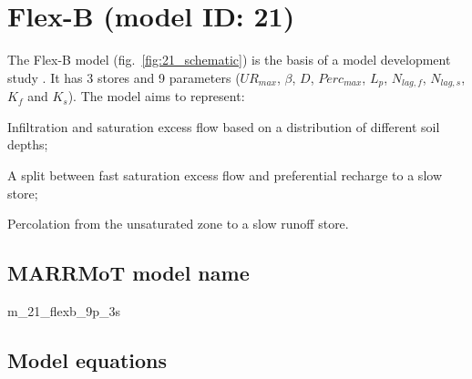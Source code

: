 \section{Flex-B (model ID: 21)}
The Flex-B model (fig.~\ref{fig:21_schematic}) is the basis of a model development study \citep{Fenicia2008}. It has 3 stores and 9 parameters ($UR_{max}$, $\beta$, $D$, $Perc_{max}$, $L_p$, $N_{lag,f}$, $N_{lag,s}$, $K_f$ and $K_s$). The model aims to represent:

\begin{itemizecompact}
\item Infiltration and saturation excess flow based on a distribution of different soil depths;
\item A split between fast saturation excess flow and preferential recharge to a slow store;
\item Percolation from the unsaturated zone to a slow runoff store.
\end{itemizecompact}

\subsection{MARRMoT model name}
m\_21\_flexb\_9p\_3s \\

\subsection{Model equations}

